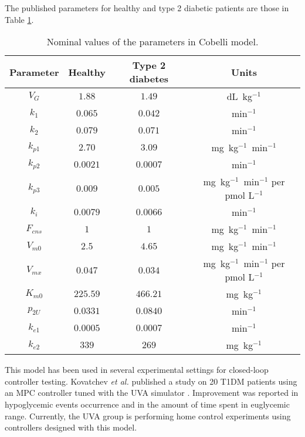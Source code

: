 The published parameters for healthy and type 2 diabetic patients are those in Table \ref{tab:cobelli}. %
\begin{table}[hbtp]
	\centering
		\begin{tabular}{|c c c c|}
		\hline 
		Parameter & Healthy & Type 2 diabetes & Units \\
		\hline 
		$V_{G}$ & $1.88$ & $1.49$ & dL\ kg$^{-1}$ \\
		$k_{1}$ & $0.065$ & $0.042$ & min$^{-1}$ \\
		$k_{2}$ & $0.079$ & $0.071$ & min$^{-1}$ \\
		$k_{p1}$ & $2.70$ & $3.09$ & mg\ kg$^{-1}$\ min$^{-1}$ \\
		$k_{p2}$ & $0.0021$ & $0.0007$ & min$^{-1}$ \\
		$k_{p3}$ & $0.009$ & $0.005$ &  mg\ kg$^{-1}$\ min$^{-1}$ per pmol L$^{-1}$ \\
		$k_{i}$ & $0.0079$ & $0.0066$ & min$^{-1}$ \\
		$F_{cns}$ & $1$ & $1$ &  mg\ kg$^{-1}$\ min$^{-1}$ \\
		$V_{m0}$ & $2.5$ & $4.65$ &  mg\ kg$^{-1}$\ min$^{-1}$ \\
		$V_{mx}$ & $0.047$ & $0.034$ &  mg\ kg$^{-1}$\ min$^{-1}$ per pmol L$^{-1}$ \\
		$K_{m0}$ & $225.59$ & $466.21$ & mg\ kg$^{-1}$ \\
		$p_{2U}$ & $0.0331$ & $0.0840$ & min$^{-1}$ \\
		$k_{e1}$ & $0.0005$ & $0.0007$ & min$^{-1}$ \\
		$k_{e2}$ & $339$ & $269$ & mg\ kg$^{-1}$ \\
		\hline
		\end{tabular}
	\caption{Nominal values of the parameters in Cobelli model.}
	\label{tab:cobelli}
\end{table}

This model has been used in several experimental settings for closed-loop controller testing. Kovatchev \textit{et al.} published a study on 20 T1DM patients using an MPC controller tuned with the UVA simulator \cite{kovatchev2010multinational} \cite{clarke2009closed}. Improvement was reported in hypoglycemic events occurrence and in the amount of time spent in euglycemic range. Currently, the UVA group is performing home control experiments using controllers designed with this model.

